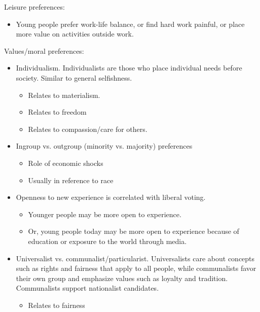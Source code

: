 \documentclass[12pt]{article}
\begin{document}
    Leisure preferences:
    \begin{itemize}
        \item Young people prefer work-life balance, or find hard work painful, or place more value on activities outside work.
    \end{itemize}

    Values/moral preferences:
        \begin{itemize}
        \item Individualism. Individualists are those who place individual needs before society. Similar to general selfishness.
        \begin{itemize}
            \item Relates to materialism.
            \item Relates to freedom
            \item Relates to compassion/care for others.
        \end{itemize}
        \item Ingroup vs. outgroup (minority vs. majority) preferences
        \begin{itemize}
            \item Role of economic shocks
            \item Usually in reference to race
        \end{itemize}
        \item Openness to new experience is correlated with liberal voting. 
        \begin{itemize}
            \item Younger people may be more open to experience.
            \item Or, young people today may be more open to experience because of education or exposure to the world through media.
        \end{itemize} 
        \item Universalist vs. communalist/particularist. Universalists care about concepts such as rights and fairness that apply to all people, while communalists favor their own group and emphasize values such as loyalty and tradition. Communalists support nationalist candidates.
        \begin{itemize}
            \item Relates to fairness
        \end{itemize}
            
    \end{itemize}
\end{document}
